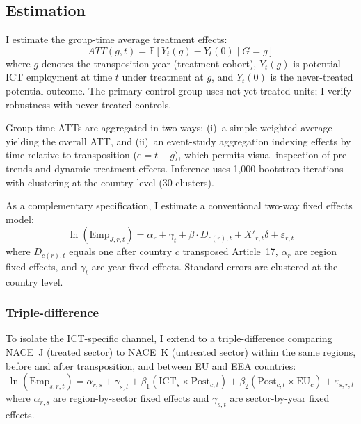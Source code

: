 \documentclass[12pt]{article}
\newcommand{\E}{\mathbb{E}}
\begin{document}
\subsection{Estimation}

I estimate the \citet{callaway2021difference} group-time average treatment effects:
\begin{equation}
ATT(g,t) = \E[Y_t(g) - Y_t(0) \mid G = g]
\end{equation}
where $g$ denotes the transposition year (treatment cohort), $Y_t(g)$ is potential ICT employment at time $t$ under treatment at $g$, and $Y_t(0)$ is the never-treated potential outcome. The primary control group uses not-yet-treated units; I verify robustness with never-treated controls.

Group-time ATTs are aggregated in two ways: (i)~a simple weighted average yielding the overall ATT, and (ii)~an event-study aggregation indexing effects by time relative to transposition ($e = t - g$), which permits visual inspection of pre-trends and dynamic treatment effects. Inference uses 1,000 bootstrap iterations with clustering at the country level (30 clusters).

As a complementary specification, I estimate a conventional two-way fixed effects model:
\begin{equation}
\ln(\text{Emp}_{J,r,t}) = \alpha_r + \gamma_t + \beta \cdot D_{c(r),t} + X'_{r,t}\delta + \varepsilon_{r,t}
\end{equation}
where $D_{c(r),t}$ equals one after country $c$ transposed Article~17, $\alpha_r$ are region fixed effects, and $\gamma_t$ are year fixed effects. Standard errors are clustered at the country level.

\subsubsection*{Triple-difference} To isolate the ICT-specific channel, I extend to a triple-difference comparing NACE~J (treated sector) to NACE~K (untreated sector) within the same regions, before and after transposition, and between EU and EEA countries:
\begin{equation}
\ln(\text{Emp}_{s,r,t}) = \alpha_{r,s} + \gamma_{s,t} + \beta_1 (\text{ICT}_s \times \text{Post}_{c,t}) + \beta_2 (\text{Post}_{c,t} \times \text{EU}_c) + \varepsilon_{s,r,t}
\end{equation}
where $\alpha_{r,s}$ are region-by-sector fixed effects and $\gamma_{s,t}$ are sector-by-year fixed effects.
\end{document}
